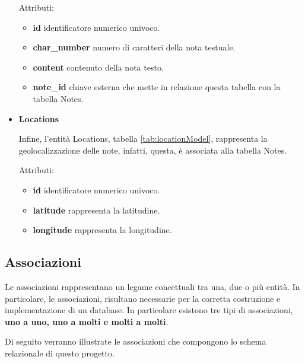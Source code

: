 \begin{itemize}
		Attributi:
		\begin{itemize}
		\item \textbf{id} identificatore numerico univoco.
		\item \textbf{char\_number} numero di caratteri della nota testuale.
		\item \textbf{content} contenuto della nota testo.
		\item \textbf{note\_id} chiave esterna che mette in relazione questa tabella con la tabella Notes.
		\end{itemize}
		
	\item \textbf{Locations}
	
		Infine, l'entità Locations, tabella \ref{tab:locationModel}, rappresenta la geolocalizzazione delle note, infatti, questa, è associata alla tabella Notes.
		
		Attributi:
		\begin{itemize}
			\item \textbf{id} identificatore numerico univoco.
			\item \textbf{latitude} rappresenta la latitudine.
			\item \textbf{longitude} rappresenta la longitudine.
		\end{itemize}
	
\end{itemize}

\subsection{Associazioni}

Le associazioni rappresentano un legame concettuali tra una, due o più entità. In particolare, le associazioni, risultano necessarie per la corretta costruzione e implementazione di un database. In particolare esistono tre tipi di associazioni, \textbf{uno a uno, uno a molti e molti a molti}.

Di seguito verranno illustrate le associazioni che compongono lo schema relazionale di questo progetto.

